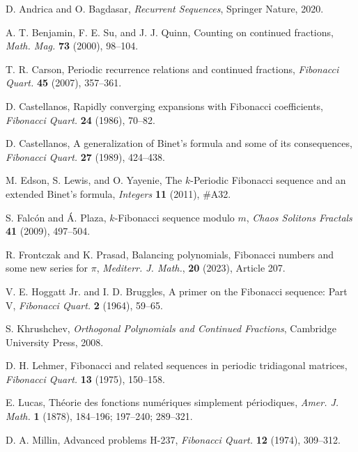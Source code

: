 \documentclass[12pt]{article}
\theoremstyle{plain}
\theoremstyle{definition}
\theoremstyle{remark}
\begin{document}
\begin{thebibliography}{}	
	 D. Andrica and O. Bagdasar, \textit{Recurrent Sequences}, Springer Nature, 2020.
	
	 A. T. Benjamin, F. E. Su, and J. J. Quinn, Counting on continued fractions, \textit{Math. Mag.} \textbf{73} (2000), 98--104.
	
	 T. R. Carson, Periodic recurrence relations and continued fractions, \textit{Fibonacci Quart.} \textbf{45} (2007), 357--361.
	
	 D. Castellanos, Rapidly converging expansions with Fibonacci coefficients, \textit{Fibonacci Quart.} \textbf{24} (1986), 70--82.

	 D. Castellanos, A generalization of Binet's formula and some of its consequences, \textit{Fibonacci Quart.} \textbf{27} (1989), 424--438.
	
	 M. Edson, S. Lewis, and O. Yayenie, The $ k $-Periodic Fibonacci sequence and an extended Binet's formula, \textit{Integers} \textbf{11} (2011), \#A32.
	
	 S. Falc\'{o}n and \'{A}. Plaza, $ k $-Fibonacci sequence modulo $ m $, \textit{Chaos Solitons Fractals} \textbf{41} (2009), 497--504.	
	
	 R. Frontczak and K. Prasad, Balancing polynomials, Fibonacci numbers and some new series for $ \pi $, \textit{Mediterr. J. Math.}, \textbf{20} (2023), Article 207. 
	
	 V. E. Hoggatt Jr. and I. D. Bruggles, A primer on the Fibonacci sequence: Part V, \textit{Fibonacci Quart.} \textbf{2} (1964), 59--65.

	 S. Khrushchev, \textit{Orthogonal Polynomials and Continued Fractions}, Cambridge University Press, 2008.
	
	 D. H. Lehmer, Fibonacci and related sequences in periodic tridiagonal matrices, \textit{Fibonacci Quart.} \textbf{13} (1975), 150--158.

	 E. Lucas, Th\'{e}orie des fonctions num\'{e}riques simplement p\'{e}riodiques, \textit{Amer. J. Math.} \textbf{1} (1878), 184--196; 197--240; 289--321.
	
	 D. A. Millin, Advanced problems H-237, \textit{Fibonacci Quart.} \textbf{12} (1974), 309--312.
	

\end{thebibliography}
\end{document}
